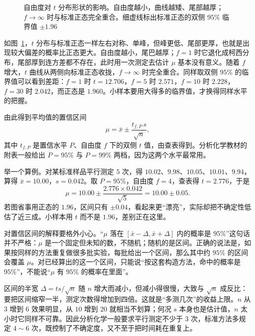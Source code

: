 \documentclass[UTF8]{ctexbook}
\begin{document}
\begin{figure}[H]
\caption{自由度对 $t$ 分布形状的影响。自由度越小，曲线越矮、尾部越厚；$f\to\infty$ 时与标准正态完全重合。细虚线标出标准正态的双侧 $95\%$ 临界值 $\pm1.96$}
\label{fig:err-t}
\end{figure}

如图~\ref{fig:err-t}，$t$ 分布与标准正态一样左右对称、单峰，但峰更低、尾部更厚，也就是出现较大偏差的概率比正态更大。自由度越小，尾巴越厚；$f=1$ 时它退化成柯西分布，尾部厚到连方差都不存在，此时用一次测定去估计 $\mu$ 基本没有意义。随着 $f$ 增大，$t$ 曲线从两侧向标准正态收拢，$f\to\infty$ 时完全重合。同样取双侧 $95\%$ 的临界值可以看到差距：$f=1$ 时 $t=12.706$，$f=5$ 时 $2.571$，$f=10$ 时 $2.228$，$f=30$ 时 $2.042$，而正态是 $1.960$。小样本要用大得多的临界值，才换得同样水平的把握。

由此得到平均值的置信区间
\[
\mu=\bar{x}\pm\frac{t_{f,P}\,s}{\sqrt{n}},
\]
其中 $t_{f,P}$ 是置信水平 $P$、自由度 $f$ 下的双侧 $t$ 值，由查表得到。分析化学教材的附表一般给出 $P=95\%$ 与 $P=99\%$ 两档，因为这两个水平最常用。

举一个算例。对某标准样品平行测定 $5$ 次，得 $10.02$、$9.98$、$10.05$、$10.01$、$9.94$，算得 $\bar{x}=10.00$，$s=0.042$。取 $P=95\%$，自由度 $f=4$，查表得 $t=2.776$，于是
\[
\mu=10.00\pm\frac{2.776\times0.042}{\sqrt{5}}=10.00\pm0.05.
\]
若图省事用正态的 $1.96$，区间只有 $\pm0.04$，看起来更“漂亮”，实际却把不确定性低估了近三成。小样本用 $t$ 而不是 $1.96$，差别正在这里。

对置信区间的解释要格外小心。“$\mu$ 落在 $[\bar{x}-\Delta,\bar{x}+\Delta]$ 内的概率是 $95\%$”这句话并不严格：$\mu$ 是一个固定但未知的数，不随机；随机的是区间。正确的说法是，如果按同样的方法重复做很多批实验，每批给出一个区间，那么其中约 $95\%$ 的区间会覆盖 $\mu$。对已经算出的这一个区间，只能说“按这套构造方法，命中的概率是 $95\%$”，不能说“$\mu$ 有 $95\%$ 的概率在里面”。

区间的半宽 $\Delta=t s/\sqrt{n}$ 随 $n$ 增大而减小，但减小得很慢，大致与 $\sqrt{n}$ 成反比：要把区间缩窄一半，测定次数得增加到四倍。这就是“多测几次”的收益上限。$n$ 从 $3$ 增到 $6$ 效果明显，从 $10$ 增到 $20$ 就相当不划算；何况 $s$ 本身也是估计值，$n$ 太小时它同样不可靠。因此分析化学一般要求平行测定不少于 $3$ 次，标准方法多规定 $4\sim6$ 次，既控制了不确定度，又不至于把时间耗在重复上。
\end{document}
